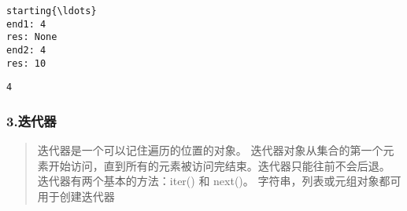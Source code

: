 \documentclass[11pt]{article}
\makeatletter
\newcommand{\boxspacing}{\kern\kvtcb@left@rule\kern\kvtcb@boxsep}
\newcommand{\prompt}[4]{
        \ttfamily\llap{{\color{#2}[#3]:\hspace{3pt}#4}}\vspace{-\baselineskip}
    }
\makeatother
\begin{document}
    \begin{Verbatim}[commandchars=\\\{\}]
starting{\ldots}
end1: 4
res: None
end2: 4
res: 10
    \end{Verbatim}

            \begin{tcolorbox}[breakable, size=fbox, boxrule=.5pt, pad at break*=1mm, opacityfill=0]
\prompt{Out}{outcolor}{6}{\boxspacing}
\begin{Verbatim}[commandchars=\\\{\}]
4
\end{Verbatim}
\end{tcolorbox}
        
    \hypertarget{ux8fedux4ee3ux5668}{%
\subsubsection{3.迭代器}\label{ux8fedux4ee3ux5668}}

\begin{quote}
迭代器是一个可以记住遍历的位置的对象。
迭代器对象从集合的第一个元素开始访问，直到所有的元素被访问完结束。迭代器只能往前不会后退。
迭代器有两个基本的方法：iter() 和 next()。
字符串，列表或元组对象都可用于创建迭代器
\end{quote}
\end{document}

